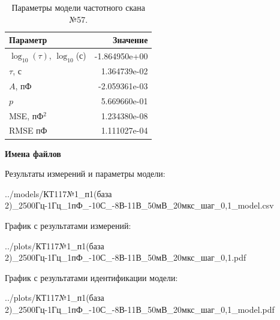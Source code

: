 \begin{table}[!ht]
    \centering
    \caption{Параметры модели частотного скана №57.}
    \begin{tabular}{|l|r|}
        \hline
        Параметр                                       & Значение                  \\ \hline
        $\log_{10}(\tau)$, $\log_{10}$(с)              & -1.864950e+00             \\ \hline
        $\tau$, с                                      & 1.364739e-02              \\ \hline
        $A$, пФ                                        & -2.059361e-03             \\ \hline
        $p$                                            & 5.669660e-01              \\ \hline
        MSE, пФ$^2$                                    & 1.234380e-08              \\ \hline
        RMSE пФ                                        & 1.111027e-04              \\ \hline
    \end{tabular}
    \label{table:frequency_scan_model_57}
\end{table}

\textbf{Имена файлов}

Результаты измерений и параметры модели:

\scriptsize../models/КТ117№1\_п1(база 2)\_2500Гц-1Гц\_1пФ\_-10С\_-8В-11В\_50мВ\_20мкс\_шаг\_0,1\_model.csv
\normalsize

График с результатами измерений:

\scriptsize../plots/КТ117№1\_п1(база 2)\_2500Гц-1Гц\_1пФ\_-10С\_-8В-11В\_50мВ\_20мкс\_шаг\_0,1.pdf
\normalsize

График с результатами идентификации модели:

\scriptsize../plots/КТ117№1\_п1(база 2)\_2500Гц-1Гц\_1пФ\_-10С\_-8В-11В\_50мВ\_20мкс\_шаг\_0,1\_model.pdf
\normalsize

